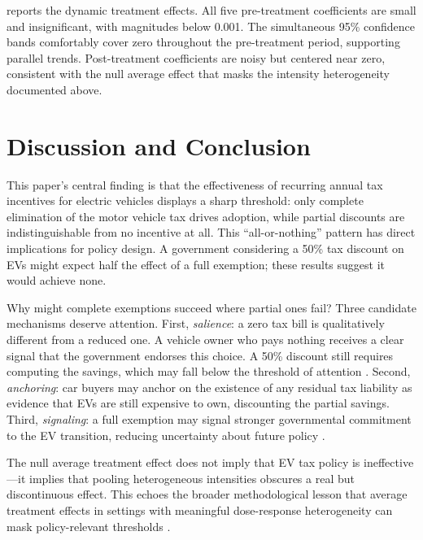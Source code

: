 \documentclass[12pt]{article}
\begin{document}
 reports the \citet{callaway2021difference} dynamic treatment effects. All five pre-treatment coefficients are small and insignificant, with magnitudes below 0.001. The simultaneous 95\% confidence bands comfortably cover zero throughout the pre-treatment period, supporting parallel trends. Post-treatment coefficients are noisy but centered near zero, consistent with the null average effect that masks the intensity heterogeneity documented above.



\section{Discussion and Conclusion}

This paper's central finding is that the effectiveness of recurring annual tax incentives for electric vehicles displays a sharp threshold: only complete elimination of the motor vehicle tax drives adoption, while partial discounts are indistinguishable from no incentive at all. This ``all-or-nothing'' pattern has direct implications for policy design. A government considering a 50\% tax discount on EVs might expect half the effect of a full exemption; these results suggest it would achieve none.

Why might complete exemptions succeed where partial ones fail? Three candidate mechanisms deserve attention. First, \textit{salience}: a zero tax bill is qualitatively different from a reduced one. A vehicle owner who pays nothing receives a clear signal that the government endorses this choice. A 50\% discount still requires computing the savings, which may fall below the threshold of attention \citep{chetty2009salience, finkelstein2009ztax}. Second, \textit{anchoring}: car buyers may anchor on the existence of any residual tax liability as evidence that EVs are still expensive to own, discounting the partial savings. Third, \textit{signaling}: a full exemption may signal stronger governmental commitment to the EV transition, reducing uncertainty about future policy \citep{aghion2016carbon}.

The null average treatment effect does not imply that EV tax policy is ineffective---it implies that pooling heterogeneous intensities obscures a real but discontinuous effect. This echoes the broader methodological lesson that average treatment effects in settings with meaningful dose-response heterogeneity can mask policy-relevant thresholds \citep{angrist2010credibility, heckman2001policy}.
\end{document}
